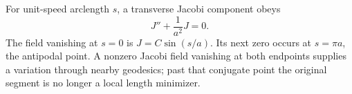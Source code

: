 \begin{enumerate}[leftmargin=2.8em,itemsep=1.2em]
For unit-speed arclength \(s\), a transverse Jacobi component obeys
\[
 J''+\frac1{a^2}J=0.
\]
The field vanishing at \(s=0\) is \(J=C\sin(s/a)\).  Its next zero occurs at
\(s=\pi a\), the antipodal point.  A nonzero Jacobi field vanishing at both
endpoints supplies a variation through nearby geodesics; past that conjugate
point the original segment is no longer a local length minimizer.
\end{enumerate}
